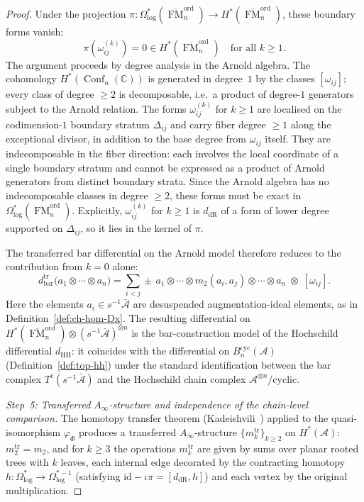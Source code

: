 \documentclass[11pt,reqno]{amsart}
\theoremstyle{definition}
\theoremstyle{remark}
\newcommand{\cA}{\mathcal{A}}
\newcommand{\HH}{\mathrm{HH}}
\newcommand{\Ainf}{A_{\infty}}
\DeclareMathOperator{\Conf}{Conf}
\DeclareMathOperator{\FM}{FM}
\newcommand{\CC}{\mathbb{C}}
\newcommand{\id}{\mathrm{id}}
\numberwithin{equation}{section}
\begin{document}
\begin{proof}
Under the projection
$\pi \colon \Omega^*_{\log}(\overline{\FM}_n^{\mathrm{ord}})
\to H^*(\overline{\FM}_n^{\mathrm{ord}})$,
these boundary forms vanish:
\begin{equation}\label{eq:higher-mode-vanishing}
  \pi(\omega_{ij}^{(k)}) = 0
  \in H^*(\overline{\FM}_n^{\mathrm{ord}})
  \quad \text{for all } k \geq 1.
\end{equation}
The argument proceeds by degree analysis in the Arnold
algebra. The cohomology $H^*(\Conf_n(\CC))$ is generated
in degree~$1$ by the classes $[\omega_{ij}]$; every class
of degree $\geq 2$ is decomposable, i.e.\ a product of
degree-$1$ generators subject to the Arnold relation.
The forms $\omega_{ij}^{(k)}$ for $k \geq 1$ are
localised on the codimension-$1$ boundary stratum
$\Delta_{ij}$ and carry fiber degree $\geq 1$ along the
exceptional divisor, in addition to the base degree from
$\omega_{ij}$ itself. They are indecomposable in the
fiber direction: each involves the local coordinate of a
single boundary stratum and cannot be expressed as a
product of Arnold generators from distinct boundary
strata. Since the Arnold algebra has no indecomposable
classes in degree $\geq 2$, these forms must be exact
in $\Omega^*_{\log}(\overline{\FM}_n^{\mathrm{ord}})$.
Explicitly, $\omega_{ij}^{(k)}$ for $k \geq 1$ is
$d_{\mathrm{dR}}$ of a form of lower degree supported
on $\Delta_{ij}$, so it lies in the kernel of $\pi$.

The transferred bar differential on the Arnold model
therefore reduces to the contribution from $k = 0$
alone:
\[
  d_{\mathrm{bar}}^{\mathrm{tr}}
  \bigl(a_1 \otimes \cdots \otimes a_n\bigr)
  = \sum_{i < j} \pm\,
  a_1 \otimes \cdots \otimes m_2(a_i, a_j)
  \otimes \cdots \otimes a_n
  \;\otimes\; [\omega_{ij}].
\]
Here the elements $a_i \in s^{-1}\bar{\cA}$ are desuspended
augmentation-ideal elements, as in
Definition~\ref{def:ch-hom-Dx}. The resulting differential
on $H^*(\overline{\FM}_n^{\mathrm{ord}}) \otimes
(s^{-1}\bar{\cA})^{\otimes n}$ is the bar-construction
model of the Hochschild differential $d_{\HH}$: it
coincides with the differential on $B^{\mathrm{cyc}}_n(\cA)$
\textup{(}Definition~\textup{\ref{def:top-hh}}\textup{)}
under the standard identification between the bar complex
$T^c(s^{-1}\bar{\cA})$ and the Hochschild chain complex
$\cA^{\otimes n}/\mathrm{cyclic}$.

\medskip
\noindent\textit{Step~5: Transferred $\Ainf$-structure
and independence of the chain-level comparison.}
The homotopy transfer theorem
\textup{(}Kadeishvili~\cite{Kadeishvili82}\textup{)}
applied to the quasi-isomorphism $\varphi_\Phi$
produces a transferred $\Ainf$-structure
$\{m_k^{\mathrm{tr}}\}_{k \geq 2}$ on $H^*(\cA)$:
$m_2^{\mathrm{tr}} = m_2$, and for $k \geq 3$ the
operations $m_k^{\mathrm{tr}}$ are given by sums over
planar rooted trees with $k$ leaves, each internal edge
decorated by the contracting homotopy
$h \colon \Omega^*_{\log} \to \Omega^{*-1}_{\log}$
\textup{(}satisfying
$\id - \iota\pi = [d_{\mathrm{dR}}, h]$\textup{)}
and each vertex by the original multiplication.


\end{proof}
\end{document}

